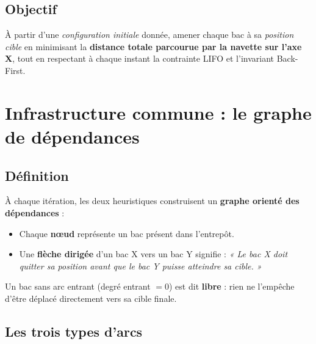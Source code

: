 \documentclass[12pt,a4paper]{article}
\begin{document}
\subsection{Objectif}

À partir d'une \emph{configuration initiale} donnée, amener chaque bac
à sa \emph{position cible} en minimisant la \textbf{distance totale
parcourue par la navette sur l'axe X}, tout en respectant à chaque
instant la contrainte LIFO et l'invariant Back-First.

\section{Infrastructure commune : le graphe de dépendances}

\subsection{Définition}

À chaque itération, les deux heuristiques construisent un \textbf{graphe orienté des dépendances} :

\begin{itemize}[noitemsep]
  \item Chaque \textbf{nœud} représente un bac présent dans l'entrepôt.
  \item Une \textbf{flèche dirigée} d'un bac X vers un bac Y signifie : \emph{« Le bac X doit quitter sa position avant que le bac Y puisse atteindre sa cible. »}
\end{itemize}

Un bac sans arc entrant (degré entrant $= 0$) est dit \textbf{libre} :
rien ne l'empêche d'être déplacé directement vers sa cible finale.

\subsection{Les trois types d'arcs}
\end{document}
